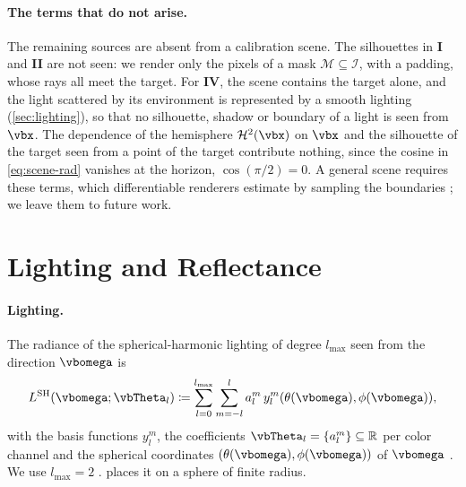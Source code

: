 \paragraph{The terms that do not arise.}
The remaining sources are absent from a calibration scene. The
silhouettes in \textbf{I} and \textbf{II} are not seen: we render
only the pixels of a mask $\mathcal{M}\subseteq\mathcal{I}$, with a
padding, whose rays all meet the target. For \textbf{IV}, the scene
contains the target alone, and the light scattered by its
environment is represented by a smooth lighting
(\cref{sec:lighting}), so that no silhouette, shadow or boundary of
a light is seen from $\vbx$. The dependence of the hemisphere
$\mathcal{H}^2(\vbx)$ on $\vbx$ and the silhouette of the target seen
from a point of the target contribute nothing, since the cosine in
\cref{eq:scene-rad} vanishes at the horizon, $\cos(\pi/2)=0$. A
general scene requires these terms, which differentiable renderers
estimate by sampling the boundaries
\cite{Li:2018:DMC, Zhang:2020:PSDR, mitsuba-projective}; we leave
them to future work.


\section{Lighting and Reflectance}
\label{sec:supp-reflectance}
\paragraph{Lighting.}
The radiance of the spherical-harmonic lighting of degree
$l_{\max}$ seen from the direction $\vbomega$ is
\begin{align*}
    L^{\text{SH}}(\vbomega;\vbTheta_l)
    \coloneqq \sum_{l=0}^{l_{\max}} \sum_{m=-l}^{l} a_{l}^{m}\,y_l^m(\theta(\vbomega), \phi(\vbomega)),
\end{align*}
with the basis functions $y_l^m$, the coefficients
$\vbTheta_l=\{a_{l}^m\}\subseteq\mathbb{R}$ per color channel and the
spherical coordinates $(\theta(\vbomega), \phi(\vbomega))$ of
$\vbomega$ \cite{sphericalHarmonics, peter-pikesloanand2002precomputed, sh-legendre, ramamoorthi-2001}.
We use $l_{\max}=2$ \cite{ramamoorthi-2001}. 
places it on a sphere of finite radius.

